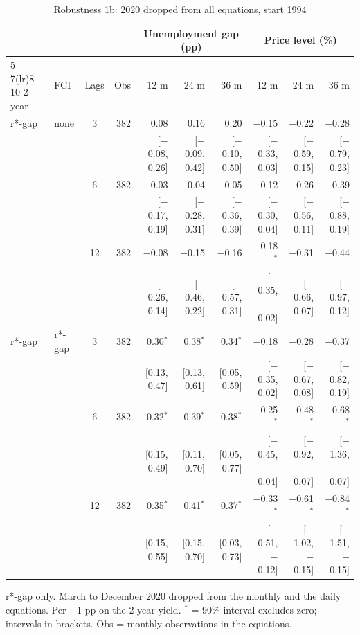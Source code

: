 \begin{table}[p]\centering\footnotesize\setlength{\tabcolsep}{2.2pt}
\caption{Robustness 1b: 2020 dropped from all equations, start 1994}\label{tab:R1b}
\begin{tabular}{llcrrrrrrr}\toprule
 & & & & \multicolumn{3}{c}{Unemployment gap (pp)} & \multicolumn{3}{c}{Price level (\%)}\\ \cmidrule(lr){5-7}\cmidrule(lr){8-10}
2-year & FCI & Lags & Obs & 12 m & 24 m & 36 m & 12 m & 24 m & 36 m\\ \midrule
r*-gap & none & 3 & 382 & 0.08 & 0.16 & 0.20 & $-$0.15 & $-$0.22 & $-$0.28\\
 & & & & {\scriptsize [$-$0.08, 0.26]} & {\scriptsize [$-$0.09, 0.42]} & {\scriptsize [$-$0.10, 0.50]} & {\scriptsize [$-$0.33, 0.03]} & {\scriptsize [$-$0.59, 0.15]} & {\scriptsize [$-$0.79, 0.23]}\\
 &  & 6 & 382 & 0.03 & 0.04 & 0.05 & $-$0.12 & $-$0.26 & $-$0.39\\
 & & & & {\scriptsize [$-$0.17, 0.19]} & {\scriptsize [$-$0.28, 0.31]} & {\scriptsize [$-$0.36, 0.39]} & {\scriptsize [$-$0.30, 0.04]} & {\scriptsize [$-$0.56, 0.11]} & {\scriptsize [$-$0.88, 0.19]}\\
 &  & 12 & 382 & $-$0.08 & $-$0.15 & $-$0.16 & $-$0.18$^{*}$ & $-$0.31 & $-$0.44\\
 & & & & {\scriptsize [$-$0.26, 0.14]} & {\scriptsize [$-$0.46, 0.22]} & {\scriptsize [$-$0.57, 0.31]} & {\scriptsize [$-$0.35, $-$0.02]} & {\scriptsize [$-$0.66, 0.07]} & {\scriptsize [$-$0.97, 0.12]}\\
r*-gap & r*-gap & 3 & 382 & 0.30$^{*}$ & 0.38$^{*}$ & 0.34$^{*}$ & $-$0.18 & $-$0.28 & $-$0.37\\
 & & & & {\scriptsize [0.13, 0.47]} & {\scriptsize [0.13, 0.61]} & {\scriptsize [0.05, 0.59]} & {\scriptsize [$-$0.35, 0.02]} & {\scriptsize [$-$0.67, 0.08]} & {\scriptsize [$-$0.82, 0.19]}\\
 &  & 6 & 382 & 0.32$^{*}$ & 0.39$^{*}$ & 0.38$^{*}$ & $-$0.25$^{*}$ & $-$0.48$^{*}$ & $-$0.68$^{*}$\\
 & & & & {\scriptsize [0.15, 0.49]} & {\scriptsize [0.11, 0.70]} & {\scriptsize [0.05, 0.77]} & {\scriptsize [$-$0.45, $-$0.04]} & {\scriptsize [$-$0.92, $-$0.07]} & {\scriptsize [$-$1.36, $-$0.07]}\\
 &  & 12 & 382 & 0.35$^{*}$ & 0.41$^{*}$ & 0.37$^{*}$ & $-$0.33$^{*}$ & $-$0.61$^{*}$ & $-$0.84$^{*}$\\
 & & & & {\scriptsize [0.15, 0.55]} & {\scriptsize [0.15, 0.70]} & {\scriptsize [0.03, 0.73]} & {\scriptsize [$-$0.51, $-$0.12]} & {\scriptsize [$-$1.02, $-$0.15]} & {\scriptsize [$-$1.51, $-$0.15]}\\
\bottomrule\end{tabular}
\par\smallskip\parbox{0.96\linewidth}{\scriptsize r*-gap only. March to December 2020 dropped from the monthly and the daily equations. Per +1 pp on the 2-year yield. $^{*}$ = 90\% interval excludes zero; intervals in brackets. Obs = monthly observations in the equations.}
\end{table}
